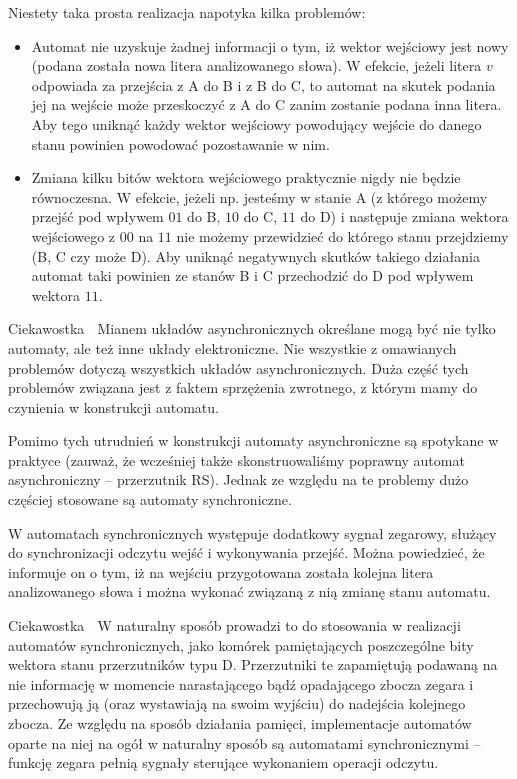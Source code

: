 \documentclass{pdfBooklets}
\begin{document}
Niestety taka prosta realizacja napotyka kilka problemów:
\begin{itemize}
\item Automat nie uzyskuje żadnej informacji o tym, iż wektor wejściowy jest nowy (podana została nowa litera analizowanego słowa).
      W efekcie, jeżeli litera $v$ odpowiada za przejścia z A do B i z B do C, to automat na skutek podania jej na wejście może przeskoczyć z A do C zanim zostanie podana inna litera.
      Aby tego uniknąć każdy wektor wejściowy powodujący wejście do danego stanu powinien powodować pozostawanie w nim.
\item Zmiana kilku bitów wektora wejściowego praktycznie nigdy nie będzie równoczesna.
      W efekcie, jeżeli np. jesteśmy w stanie A (z którego możemy przejść pod wpływem $01$ do B, $10$ do C, $11$ do D) i następuje zmiana wektora wejściowego z $00$ na $11$ nie możemy przewidzieć do którego stanu przejdziemy (B, C czy może D).
      Aby uniknąć negatywnych skutków takiego działania automat taki powinien ze stanów B i C przechodzić do D pod wpływem wektora $11$.
\end{itemize}

\begin{ProTip}{Ciekawostka {\Symbola 🤔}}
Mianem układów asynchronicznych określane mogą być nie tylko automaty, ale też inne układy elektroniczne.
Nie wszystkie z omawianych problemów dotyczą wszystkich układów asynchronicznych.
Duża część tych problemów związana jest z faktem sprzężenia zwrotnego, z którym mamy do czynienia w konstrukcji automatu.
\end{ProTip}

Pomimo tych utrudnień w konstrukcji automaty asynchroniczne są spotykane w praktyce (zauważ, że wcześniej także skonstruowaliśmy poprawny automat asynchroniczny – przerzutnik RS).
Jednak ze względu na te problemy dużo częściej stosowane są automaty synchroniczne.

W automatach synchronicznych występuje dodatkowy sygnał zegarowy, służący do synchronizacji odczytu wejść i wykonywania przejść.
Można powiedzieć, że informuje on o tym, iż na wejściu przygotowana została kolejna litera analizowanego słowa i można wykonać związaną z nią zmianę stanu automatu.

\begin{ProTip}{Ciekawostka {\Symbola 🤔}}
W naturalny sposób prowadzi to do stosowania w realizacji automatów synchronicznych, jako komórek pamiętających poszczególne bity wektora stanu przerzutników typu D.
Przerzutniki te zapamiętują podawaną na nie informację w momencie narastającego bądź opadającego zbocza zegara i przechowują ją (oraz wystawiają na swoim wyjściu) do nadejścia kolejnego zbocza.
Ze względu na sposób działania pamięci, implementacje automatów oparte na niej na ogół w naturalny sposób są automatami synchronicznymi – funkcję zegara pełnią sygnały sterujące wykonaniem operacji odczytu.
\end{ProTip}
\end{document}

